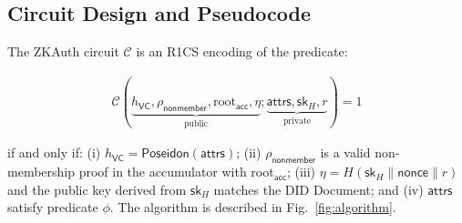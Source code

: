 \documentclass[journal,12pt,onecolumn]{IEEEtran}
\newcommand{\pstep}[1]{\tikz[baseline=(s.base)]{%
  \node[circle, draw=black, fill=white, line width=0.6pt,
        inner sep=0.6pt, minimum size=3.2mm,
        font=\tiny\bfseries\sffamily] (s) {#1};}}
\begin{document}
\begin{figure}[t]
\begin{center}
\end{center}
\end{figure}

\subsection{Circuit Design and Pseudocode}

The ZKAuth circuit $\mathcal{C}$ is an R1CS encoding of the predicate:

\begin{align}
  \mathcal{C}\left(\underbrace{h_{\mathsf{VC}},
  \rho_{\mathsf{nonmember}}, \text{root}_{\mathsf{acc}}, \eta}_{\text{public}};
  \underbrace{\mathsf{attrs}, \mathsf{sk}_H, r}_{\text{private}}\right) = 1
  \label{eq:circuit}
\end{align}

if and only if: (i) $h_{\mathsf{VC}} = \mathsf{Poseidon}(\mathsf{attrs})$;
(ii) $\rho_{\mathsf{nonmember}}$ is a valid non-membership proof in the
accumulator with root$_{\mathsf{acc}}$; (iii) $\eta =
H(\mathsf{sk}_H \| \mathsf{nonce} \| r)$ and the public key derived from $\mathsf{sk}_H$
matches the DID Document; and (iv) $\mathsf{attrs}$ satisfy predicate
$\phi$. The algorithm is described in Fig.~\ref{fig:algorithm}.
\end{document}
